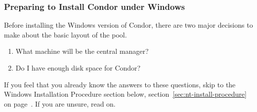 \subsubsection{\label{sec:NT-Preparing-to-Install}Preparing to Install
Condor under Windows } 

Before installing the Windows version of Condor,
there are two major
decisions to make about the basic layout of the pool.

\begin{enumerate}
\item What machine will be the central manager?
\item Do I have enough disk space for Condor?
\end{enumerate}

If you feel that you already know the answers to these questions,
skip to the Windows Installation Procedure section below,
section~\ref{sec:nt-install-procedure} on
page~\pageref{sec:nt-install-procedure}.
If you are unsure, read on.

